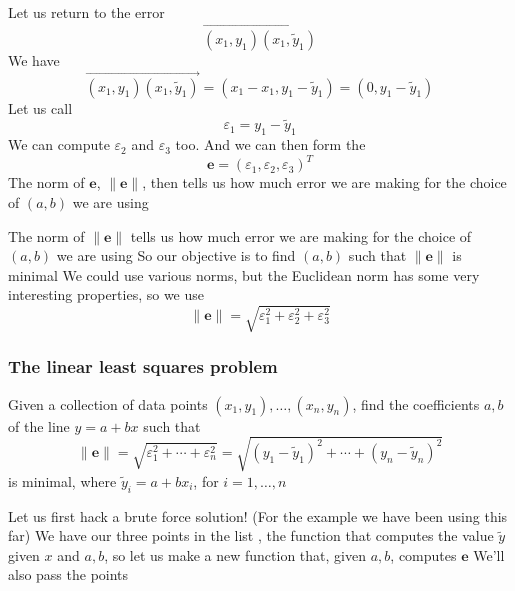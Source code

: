 \documentclass[aspectratio=169]{beamer}\usepackage[]{graphicx}\usepackage[]{xcolor}
\begin{document}
\begin{frame}
Let us return to the error
$$
\overrightarrow{(x_1,y_1)(x_1,\tilde y_1)}
$$
We have
$$
\overrightarrow{(x_1,y_1)(x_1,\tilde y_1)}
= (x_1-x_1,y_1-\tilde y_1)
= (0, y_1-\tilde y_1)
$$
\vfill
Let us call
$$
\varepsilon_1 = y_1-\tilde y_1
$$
We can compute $\varepsilon_2$ and $\varepsilon_3$ too. And we can then form the 
$$
\mathbf{e} = (\varepsilon_1,\varepsilon_2,\varepsilon_3)^T
$$
\vfill
The norm of $\mathbf{e}$, $\|\mathbf{e}\|$, then tells us how much error we are making for the choice of $(a,b)$ we are using
\end{frame}


\begin{frame}
The norm of $\|\mathbf{e}\|$ tells us how much error we are making for the choice of $(a,b)$ we are using
\vfill
So our objective is to find $(a,b)$ such that $\|\mathbf{e}\|$ is minimal
\vfill
We could use various norms, but the Euclidean norm has some very interesting properties, so we use
$$
\|\mathbf{e}\| = \sqrt{\varepsilon_1^2+\varepsilon_2^2+\varepsilon_3^2}
$$
\end{frame}


\begin{frame}\frametitle{The linear least squares problem}
Given a collection of data points $(x_1,y_1),\ldots,(x_n,y_n)$, find the coefficients $a,b$ of the line $y=a+bx$ such that
$$
\|\mathbf{e}\|=\sqrt{\varepsilon_1^2+\cdots+\varepsilon_n^2}
=\sqrt{(y_1-\tilde y_1)^2+\cdots+(y_n-\tilde y_n)^2}
$$
is minimal, where $\tilde y_i=a+bx_i$, for $i=1,\ldots,n$
\end{frame}


\begin{frame}
Let us first hack a brute force solution! (For the example we have been using this far)
\vfill
We have our three points in the list , the function  that computes the value $\tilde y$ given $x$ and $a,b$, so let us make a new function that, given $a,b$, computes $\mathbf{e}$
\vfill
We'll also pass the points 
\end{frame}
\end{document}
